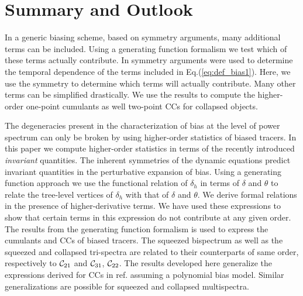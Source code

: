 \section{Summary and Outlook}
\label{sec:conclu}
%
In a generic biasing scheme, based on symmetry arguments, many additional terms can be included.
Using a generating function formalism we test which of these terms actually contribute.
In \citep{Kehagias} symmetry arguments were used to determine the temporal dependence of the terms 
included in Eq.(\ref{eq:def_bias1}). Here, we use the symmetry to determine which terms will actually contribute.
Many other terms can be simplified drastically. We use the results to compute the higher-order one-point cumulants 
as well two-point CCs for collapsed objects.

The degeneracies present in the characterization of bias at the level of power spectrum can only be broken by
using higher-order statistics of biased tracers. 
In this paper we compute higher-order statistics in terms of the recently introduced {\em invariant}
quantities. The inherent symmetries of the dynamic
equations predict invariant quantities \citep{ChecnScocSheth,Baldauf,Kehagias} in the perturbative
expansion of bias. Using a generating function approach we use the
functional relation of $\delta_h$ in terms of $\delta$ and $\theta$ to relate the
tree-level vertices of $\delta_h$ with that of $\delta$ and $\theta$.
We derive formal relations in the presence of higher-derivative terms.
We have used these expressions to show that certain terms in this expression
do not contribute at any given order. The results from the generating function formalism 
is used to express the cumulants and CCs of biased tracers.
The squeezed bispectrum as well as the squeezed and collapsed tri-spectra are related to their counterparts of same order, respectively
to ${\cal C}_{21}$ and ${\cal C}_{31}$, ${\cal C}_{22}$. The results
developed here generalize the expressions derived for CCs in ref.\citep{Munshi_IBIT} assuming a 
polynomial bias model. Similar generalizations are possible for squeezed and collapsed multispectra.

